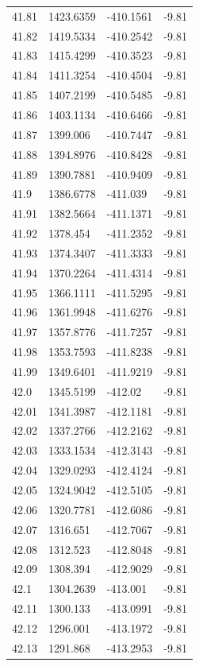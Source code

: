 \begin{table}[H]
\begin{tabular}{llll}
41.81 & 1423.6359 & -410.1561 & -9.81 \\
41.82 & 1419.5334 & -410.2542 & -9.81 \\
41.83 & 1415.4299 & -410.3523 & -9.81 \\
41.84 & 1411.3254 & -410.4504 & -9.81 \\
41.85 & 1407.2199 & -410.5485 & -9.81 \\
41.86 & 1403.1134 & -410.6466 & -9.81 \\
41.87 & 1399.006 & -410.7447 & -9.81 \\
41.88 & 1394.8976 & -410.8428 & -9.81 \\
41.89 & 1390.7881 & -410.9409 & -9.81 \\
41.9 & 1386.6778 & -411.039 & -9.81 \\
41.91 & 1382.5664 & -411.1371 & -9.81 \\
41.92 & 1378.454 & -411.2352 & -9.81 \\
41.93 & 1374.3407 & -411.3333 & -9.81 \\
41.94 & 1370.2264 & -411.4314 & -9.81 \\
41.95 & 1366.1111 & -411.5295 & -9.81 \\
41.96 & 1361.9948 & -411.6276 & -9.81 \\
41.97 & 1357.8776 & -411.7257 & -9.81 \\
41.98 & 1353.7593 & -411.8238 & -9.81 \\
41.99 & 1349.6401 & -411.9219 & -9.81 \\
42.0 & 1345.5199 & -412.02 & -9.81 \\
42.01 & 1341.3987 & -412.1181 & -9.81 \\
42.02 & 1337.2766 & -412.2162 & -9.81 \\
42.03 & 1333.1534 & -412.3143 & -9.81 \\
42.04 & 1329.0293 & -412.4124 & -9.81 \\
42.05 & 1324.9042 & -412.5105 & -9.81 \\
42.06 & 1320.7781 & -412.6086 & -9.81 \\
42.07 & 1316.651 & -412.7067 & -9.81 \\
42.08 & 1312.523 & -412.8048 & -9.81 \\
42.09 & 1308.394 & -412.9029 & -9.81 \\
42.1 & 1304.2639 & -413.001 & -9.81 \\
42.11 & 1300.133 & -413.0991 & -9.81 \\
42.12 & 1296.001 & -413.1972 & -9.81 \\
42.13 & 1291.868 & -413.2953 & -9.81 \\

\end{tabular}
\end{table}
